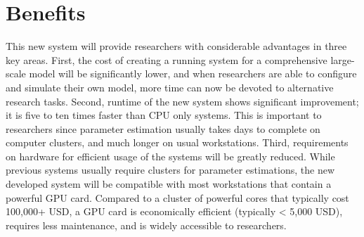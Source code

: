\documentclass[../thesis.tex]{subfiles}
\begin{document}
\section{Benefits}
This new system will provide researchers with considerable advantages in three key areas. First, the cost of creating a running system for a comprehensive large-scale model will be significantly lower, and when researchers are able to configure and simulate their own model, more time can now be devoted to alternative research tasks. Second, runtime of the new system shows significant improvement; it is five to ten times faster than CPU only systems. This is important to researchers since parameter estimation usually takes days to complete on computer clusters, and much longer on usual workstations. Third, requirements on hardware for efficient usage of the systems will be greatly reduced. While previous systems usually require clusters for parameter estimations, the new developed system will be compatible with most workstations that contain a powerful GPU card. Compared to a cluster of powerful cores that typically cost 100,000+ USD, a GPU card is economically efficient (typically < 5,000 USD), requires less maintenance, and is widely accessible to researchers.
\end{document}
